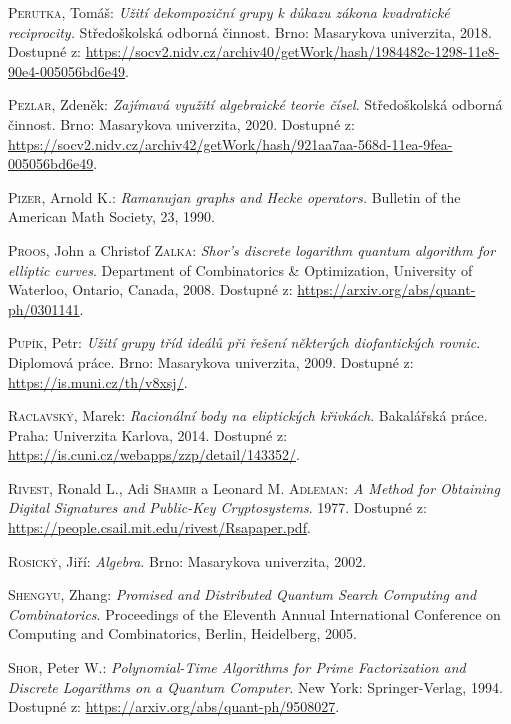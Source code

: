 \documentclass[12pt]{report}
\begin{document}
\begin{thebibliography}{97}
\textsc{Perutka}, Tomáš: \textit{Užití dekompoziční grupy k důkazu zákona kvadratické reciprocity.} Středoškolská odborná činnost. Brno: Masarykova univerzita, 2018. Dostupné z: \url{https://socv2.nidv.cz/archiv40/getWork/hash/1984482c-1298-11e8-90e4-005056bd6e49}.


\textsc{Pezlar}, Zdeněk: \textit{Zajímavá využití algebraické teorie čísel}. Středoškolská odborná činnost. Brno: Masarykova univerzita, 2020. Dostupné z: \url{https://socv2.nidv.cz/archiv42/getWork/hash/921aa7aa-568d-11ea-9fea-005056bd6e49}.

\textsc{Pizer}, Arnold K.: \textit{Ramanujan graphs and Hecke operators.} Bulletin of the American Math Society, 23, 1990.

\textsc{Proos}, John a Christof \textsc{Zalka}: \textit{Shor’s discrete logarithm quantum algorithm for elliptic curves}. Department of Combinatorics \& Optimization, University of Waterloo,  Ontario, Canada, 2008. Dostupné z: \url{https://arxiv.org/abs/quant-ph/0301141}.

\textsc{Pupík}, Petr: \textit{Užití grupy tříd ideálů při řešení některých diofantických rovnic}. Diplomová práce. Brno: Masarykova univerzita, 2009. Dostupné z: \url{https://is.muni.cz/th/v8xsj/}.

\textsc{Raclavský}, Marek: \textit{Racionální body na eliptických křivkách}. Bakalářská práce. Praha: Univerzita Karlova, 2014. Dostupné z: \url{https://is.cuni.cz/webapps/zzp/detail/143352/}.

\textsc{Rivest}, Ronald L., Adi \textsc{Shamir} a Leonard M. \textsc{Adleman}: \textit{A Method for Obtaining Digital Signatures and Public-Key Cryptosystems}. 1977. Dostupné z: \url{https://people.csail.mit.edu/rivest/Rsapaper.pdf}. 

\textsc{Rosický}, Jiří: \textit{Algebra}. Brno: Masarykova univerzita, 2002.

\textsc{Shengyu}, Zhang: \textit{Promised and Distributed Quantum Search Computing and Combinatorics}. Proceedings of the Eleventh  Annual  International Conference on Computing  and Combinatorics, Berlin, Heidelberg, 2005.

\textsc{Shor}, Peter W.: \textit{Polynomial-Time Algorithms for Prime Factorization and Discrete Logarithms on a Quantum Computer}. New York: Springer-Verlag, 1994. Dostupné z: \url{https://arxiv.org/abs/quant-ph/9508027}.


\end{thebibliography}
\end{document}
